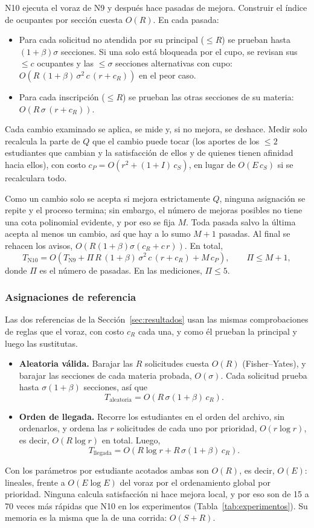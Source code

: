 N10 ejecuta el voraz de N9 y después hace pasadas de mejora. Construir el índice de ocupantes por sección cuesta $O(R)$. En cada pasada:
\begin{itemize}
\item Para cada solicitud no atendida por su principal ($\le R$) se prueban hasta $(1+\beta)\sigma$ secciones. Si una solo está bloqueada por el cupo, se revisan sus $\le c$ ocupantes y las $\le \sigma$ secciones alternativas con cupo: $O(R\,(1+\beta)\,\sigma^2\, c\,(r + c_R))$ en el peor caso.
\item Para cada inscripción ($\le R$) se prueban las otras secciones de su materia: $O(R\,\sigma\,(r + c_R))$.
\end{itemize}
Cada cambio examinado se aplica, se mide y, si no mejora, se deshace. Medir solo recalcula la parte de $Q$ que el cambio puede tocar (los aportes de los $\le 2$ estudiantes que cambian y la satisfacción de ellos y de quienes tienen afinidad hacia ellos), con costo $c_P = O(r^2 + (1+I)\,c_S)$, en lugar de $O(E\,c_S)$ si se recalculara todo.

Como un cambio solo se acepta si mejora estrictamente $Q$, ninguna asignación se repite y el proceso termina; sin embargo, el número de mejoras posibles no tiene una cota polinomial evidente, y por eso se fija $M$. Toda pasada salvo la última acepta al menos un cambio, así que hay a lo sumo $M+1$ pasadas. Al final se rehacen los avisos, $O(R(1+\beta)\sigma(c_R + c\,r))$. En total,
\[
T_{\mathrm{N10}} = O\!\left(T_{\mathrm{N9}} + \Pi\, R\,(1+\beta)\,\sigma^2\, c\,(r + c_R) + M\, c_P\right), \qquad \Pi \le M + 1,
\]
donde $\Pi$ es el número de pasadas. En las mediciones, $\Pi \le 5$.

\subsubsection{Asignaciones de referencia}

Las dos referencias de la Sección~\ref{sec:resultados} usan las mismas comprobaciones de reglas que el voraz, con costo $c_R$ cada una, y como él prueban la principal y luego las sustitutas.
\begin{itemize}
\item \textbf{Aleatoria válida.} Barajar las $R$ solicitudes cuesta $O(R)$ (Fisher--Yates), y barajar las secciones de cada materia probada, $O(\sigma)$. Cada solicitud prueba hasta $\sigma(1+\beta)$ secciones, así que
\[
T_{\mathrm{aleatoria}} = O\!\left(R\,\sigma(1+\beta)\,c_R\right).
\]
\item \textbf{Orden de llegada.} Recorre los estudiantes en el orden del archivo, sin ordenarlos, y ordena las $r$ solicitudes de cada uno por prioridad, $O(r \log r)$, es decir, $O(R \log r)$ en total. Luego,
\[
T_{\mathrm{llegada}} = O\!\left(R \log r + R\,\sigma(1+\beta)\,c_R\right).
\]
\end{itemize}
Con los parámetros por estudiante acotados ambas son $O(R)$, es decir, $O(E)$: lineales, frente a $O(E \log E)$ del voraz por el ordenamiento global por prioridad. Ninguna calcula satisfacción ni hace mejora local, y por eso son de 15 a 70 veces más rápidas que N10 en los experimentos (Tabla~\ref{tab:experimentos}). Su memoria es la misma que la de una corrida: $O(S + R)$.

